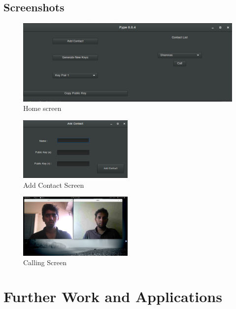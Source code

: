 \documentclass[a4paper,11pt]{article}
\begin{document}
\subsection{Screenshots}
\begin{figure}[H]
\begin{center}
  \includegraphics[width=1\textwidth]{images/homeScreen.png}
  \caption{Home screen}
\end{center}
\end{figure}
\begin{figure}[H]
\begin{center}
  \includegraphics[width=0.50\textwidth]{images/addContactScreen.png}
  \caption{Add Contact Screen}
\end{center}
\end{figure}
\begin{figure}[H]
\begin{center}
  \includegraphics[width=0.50\textwidth]{images/callScreen.png}
  \caption{Calling Screen}
\end{center}
\end{figure}

\section{Further Work and Applications}
\end{document}
